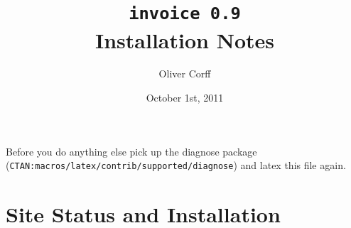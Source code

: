 \documentclass[11pt]{ltxdoc}
\title{\texttt{invoice 0.9}\\Installation Notes}
\author{Oliver Corff}
\date{October 1st, 2011}
\newif\ifBadNews
\begin{document}
\maketitle
\thispagestyle{empty}
\begin{abstract}\myabstract\end{abstract}
\ifBadNews
	\vskip 1cm
	\begin{sloppypar}
	{\large
	Before you do anything else pick up the diagnose package
	(\texttt{CTAN:macros/latex/contrib/supported/diagnose})
	and latex this file again.}
	\end{sloppypar}
\else


	\section{Site Status and Installation}
\end{document}
